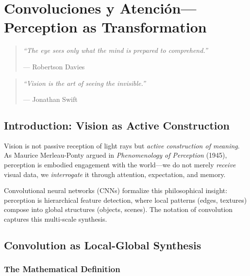 \chapter{Convoluciones y Atención---Perception as Transformation}

\begin{quote}
	\itshape
	``The eye sees only what the mind is prepared to comprehend.''
	
	\raggedleft--- Robertson Davies
\end{quote}

\begin{quote}
	\itshape
	``Vision is the art of seeing the invisible.''
	
	\raggedleft--- Jonathan Swift
\end{quote}

\section{Introduction: Vision as Active Construction}

Vision is not passive reception of light rays but \textit{active construction of meaning}. As Maurice Merleau-Ponty argued in \textit{Phenomenology of Perception} (1945), perception is embodied engagement with the world---we do not merely \textit{receive} visual data, we \textit{interrogate} it through attention, expectation, and memory.

Convolutional neural networks (CNNs) formalize this philosophical insight: perception is hierarchical feature detection, where local patterns (edges, textures) compose into global structures (objects, scenes). The notation of convolution captures this multi-scale synthesis.

\section{Convolution as Local-Global Synthesis}

\subsection{The Mathematical Definition}

